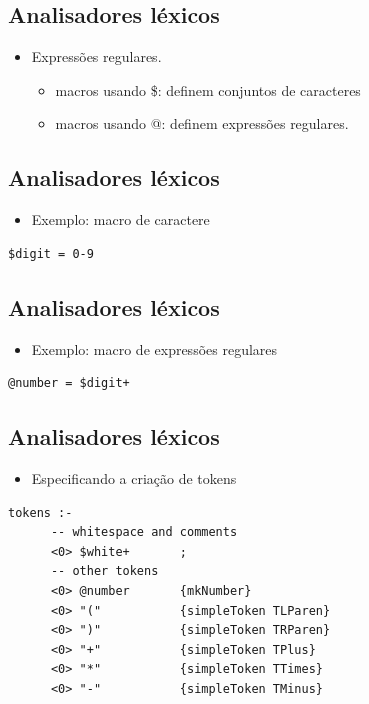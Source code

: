 \documentclass[11pt]{article}
\begin{document}
\subsection*{Analisadores léxicos}
\label{sec:org8d7f6ca}

\begin{itemize}
\item Expressões regulares.
\begin{itemize}
\item macros usando \$: definem conjuntos de caracteres
\item macros usando @: definem expressões regulares.
\end{itemize}
\end{itemize}
\subsection*{Analisadores léxicos}
\label{sec:org163719c}

\begin{itemize}
\item Exemplo: macro de caractere
\end{itemize}

\begin{verbatim}
$digit = 0-9
\end{verbatim}
\subsection*{Analisadores léxicos}
\label{sec:orgfc1db08}

\begin{itemize}
\item Exemplo: macro de expressões regulares
\end{itemize}

\begin{verbatim}
@number = $digit+
\end{verbatim}
\subsection*{Analisadores léxicos}
\label{sec:org4292c36}

\begin{itemize}
\item Especificando a criação de tokens
\end{itemize}

\begin{verbatim}
tokens :-
      -- whitespace and comments
      <0> $white+       ;
      -- other tokens
      <0> @number       {mkNumber}
      <0> "("           {simpleToken TLParen}
      <0> ")"           {simpleToken TRParen}
      <0> "+"           {simpleToken TPlus}
      <0> "*"           {simpleToken TTimes}
      <0> "-"           {simpleToken TMinus}
\end{verbatim}
\end{document}
